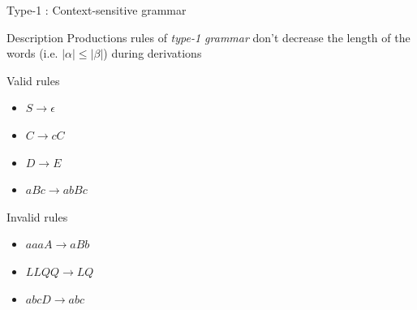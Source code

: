 \documentclass{beamer}
\begin{document}
\begin{frame}{Type-1 : Context-sensitive grammar}
	
	\begin{block}{Description}
		Productions rules of \textit{type-1 grammar} don't decrease the length of the words (i.e. $|\alpha| \leq |\beta|$) during derivations
	\end{block}
	
	\begin{exampleblock}{Valid rules}
		\begin{itemize}
			\item $S \rightarrow \epsilon$
			\item $C \rightarrow cC$
			\item $D \rightarrow E$
			\item $aBc \rightarrow abBc$
		\end{itemize}
	\end{exampleblock}
	
	\begin{alertblock}{Invalid rules}
		\begin{itemize}
			\item $aaaA \rightarrow aBb$
			\item $LLQQ \rightarrow LQ$
			\item $abcD \rightarrow abc$
		\end{itemize}
	\end{alertblock}
	
\end{frame}

\end{document}
